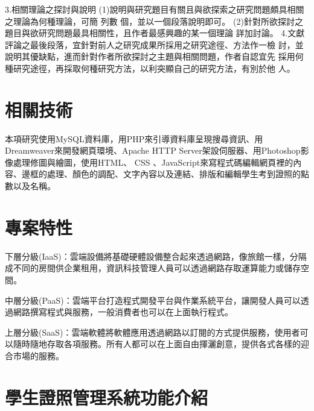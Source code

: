 3.相關理論之探討與說明
(1)說明與研究題目有關且與欲探索之研究問題頗具相關之理論為何種理論，可簡
列數 個，並以一個段落說明即可。
(2)針對所欲探討之題目與欲研究問題最具相關性，且作者最感興趣的某一個理論
詳加討論。
4.文獻評論之最後段落，宜針對前人之研究成果所採用之研究途徑、方法作一檢
討，並說明其優缺點，進而針對作者所欲探討之主題與相關問題，作者自認宜先
採用何種研究途徑，再採取何種研究方法，以利突顯自己的研究方法，有別於他
人。

  \section{相關技術}
本項研究使用MySQL資料庫，用PHP來引導資料庫呈現搜尋資訊、用Dreamweaver來開發網頁環境、Apache HTTP Server架設伺服器、用Photoshop影像處理修圖與繪圖，使用HTML、 CSS 、JavaScript來寫程式碼編輯網頁裡的內容、邊框的處理、顏色的調配、文字內容以及連結、排版和編輯學生考到證照的點數以及名稱。

  \section{專案特性}

下層分級(IaaS)：雲端設備將基礎硬體設備整合起來透過網路，像旅館一樣，分隔成不同的房間供企業租用，資訊科技管理人員可以透過網路存取運算能力或儲存空間。

中層分級(PaaS)：雲端平台打造程式開發平台與作業系統平台，讓開發人員可以透過網路撰寫程式與服務，一般消費者也可以在上面執行程式。

上層分級(SaaS)：雲端軟體將軟體應用透過網路以訂閱的方式提供服務，使用者可以隨時隨地存取各項服務。所有人都可以在上面自由揮灑創意，提供各式各樣的迎合市場的服務。

  \section{學生證照管理系統功能介紹}

